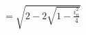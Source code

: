 \documentclass[preview]{standalone}
\begin{document}
\begin{align*}
= \sqrt{2 - 2\sqrt{1 - \frac{i_n^2}{4}}}
\end{align*}
\end{document}
